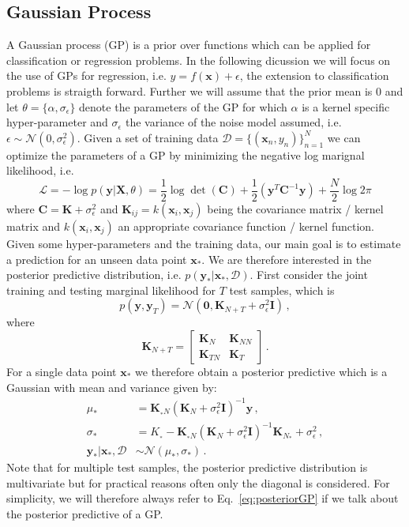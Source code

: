 \documentclass[10pt,letterpaper]{article}
\newcommand\N{\ensuremath{\mathcal{N}}}
\newcommand{\X}{\mathbf{X}}
\newcommand{\C}{\mathbf{C}}
\newcommand{\loss}{\mathcal{L}}
\newcommand{\K}{\mathbf{K}}
\newcommand{\data}{\mathcal{D}}
\newcommand{\x}{\mathbf{x}}
\newcommand{\y}{\mathbf{y}}
\newcommand{\xn}{\mathbf{x}_{n}}
\newcommand{\new}{_{*}}
\theoremstyle{mystyle}
\begin{document}
\subsection{Gaussian Process} \label{sec:gps}
A Gaussian process (GP) is a prior over functions which can be applied for classification or regression problems.
In the following dicussion we will focus on the use of GPs for regression, i.e. $y = f(\x) + \epsilon$, the extension to classification problems is straigth forward.
Further we will assume that the prior mean is $0$ and let $\theta = \{\alpha, \sigma_{\epsilon}\}$ denote the parameters of the GP for which $\alpha$ is a kernel specific hyper-parameter and $\sigma_{\epsilon}$ the variance of the noise model assumed, i.e. $\epsilon \sim \N(0, \sigma_{\epsilon}^2)$.
Given a set of training data $\data = \{(\xn, y_n)\}_{n=1}^{N}$ we can optimize the parameters of a GP by minimizing the negative log marignal likelihood, i.e.
\[
  \loss = - \log p(\y | \X, \theta) = \frac{1}{2} \log \det(\C) + \frac{1}{2}(\y^T \C^{-1} \y) + \frac{N}{2} \log 2\pi
\]
where $\C = \K + \sigma^2_{\epsilon}$ and $\K_{ij} = k(\x_i, \x_j)$ being the covariance matrix / kernel matrix and $k(\x_i, \x_j)$ an appropriate covariance function / kernel function.
Given some hyper-parameters and the training data, our main goal is to estimate a prediction for an unseen data point $\x\new$. 
We are therefore interested in the posterior predictive distribution, i.e. $p(\y\new | \x\new, \data)$.
First consider the joint training and testing marginal likelihood for $T$ test samples, which is
\[
  p(\y, \y_T) = \N(\bm 0, \K_{N+T} + \sigma^2_{\epsilon}\bm I) \, ,
\]
where
\[
\K_{N+T} = \left[ \begin{array}{cc}
\K_{N} & \K_{NN} \\
\K_{TN} & \K_{T} \end{array} \right] \, .
\]
For a single data point $\x\new$ we therefore obtain a posterior predictive which is a Gaussian with mean and variance given by:
\begin{align}
  \mu\new &= \K_{\new N} (\K_N + \sigma^2_{\epsilon}\bm I)^{-1} \y \, ,\\
  \sigma\new &= K_{\new} - \K_{\new N}(\K_N + \sigma^2_{\epsilon}\bm I)^{-1} \K_{N \new} + \sigma^2_{\epsilon} \, ,\\
  \y\new | \x\new, \data &\sim \N(\mu\new, \sigma\new)\, . \label{eq:posteriorGP}
\end{align}
Note that for multiple test samples, the posterior predictive distribution is multivariate but for practical reasons often only the diagonal is considered.
For simplicity, we will therefore always refer to Eq.~\ref{eq:posteriorGP} if we talk about the posterior predictive of a GP.
\end{document}
